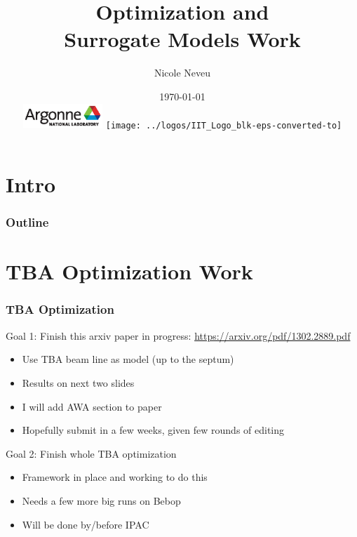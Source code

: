 \documentclass[professionalfonts,t]{beamer}
\title[]{Optimization and \\ Surrogate Models Work}
\author[N.Neveu]{{\Large Nicole Neveu}}
\institute[ANL, IIT] %
{   Illinois Institute of Technology \\
	Argonne National Laboratory \\
}
\date{ \today \\
\includegraphics[width=3cm,keepaspectratio]{../logos/Argonne_cmyk_black}%
\hfill \hfill \hfill%
\texttt{[image: ../logos/IIT\_Logo\_blk-eps-converted-to]}%
}
\begin{document}
\section{Intro}

\begin{frame}
  \titlepage
\end{frame}
\begin{frame}
	\frametitle{Outline}
	\tableofcontents
\end{frame}




\section{TBA Optimization Work}
\begin{frame}
	\frametitle{TBA Optimization}
	Goal 1: Finish this arxiv paper in progress: \url{https://arxiv.org/pdf/1302.2889.pdf}
		\begin{itemize}
			\item Use TBA beam line as model (up to the septum)
			\item Results on next two slides 
			\item I will add AWA section to paper
			\item Hopefully submit in a few weeks, given few rounds of editing
		\end{itemize} 
	\vspace{1em}
	Goal 2: Finish whole TBA optimization
		\begin{itemize}
			\item Framework in place and working to do this
			\item Needs a few more big runs on Bebop 
			\item Will be done by/before IPAC
		\end{itemize}

\end{frame}
\end{document}
